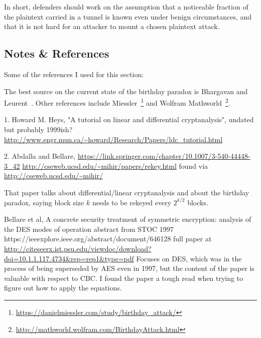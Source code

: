 In short, defenders should work on the assumption that a noticeable
fraction of the plaintext carried in a tunnel is known even under
benign circumstances, and that it is not hard for an attacker
to mount a chosen plaintext attack.

\subsection{Notes \& References}

Some of the references I used for this section:

The best source on the current state of the birthday paradox is Bhargavan and Leurent~\cite{bhargavan2016practical}.  Other references include Miessler~\footnote{\url{https://danielmiessler.com/study/birthday_attack/}} and Wolfram Mathworld~\footnote{\url{http://mathworld.wolfram.com/BirthdayAttack.html}}.

1. Howard M. Heys, "A tutorial on linear and differential
cryptanalysis", undated but probably 1999ish?
\url{http://www.engr.mun.ca/~howard/Research/Papers/ldc_tutorial.html}

2. Abdalla and Bellare,
\url{https://link.springer.com/chapter/10.1007/3-540-44448-3_42}
\url{http://cseweb.ucsd.edu/~mihir/papers/rekey.html}
found via
\url{http://cseweb.ucsd.edu/~mihir/}

That paper talks about differential/linear cryptanalysis and about the
birthday paradox, saying block size $k$ needs to be rekeyed every
$2^{k/2}$ blocks.

Bellare et al, A concrete security treatment of symmetric encryption:
analysis of the DES modes of operation
abstract from STOC 1997
https://ieeexplore.ieee.org/abstract/document/646128
full paper at
\url{http://citeseerx.ist.psu.edu/viewdoc/download?doi=10.1.1.117.4734&rep=rep1&type=pdf}
Focuses on DES, which was in the process of being superseded by AES
even in 1997, but the content of the paper is valuable with respect to
CBC.  I found the paper a tough read when trying to figure out how to
apply the equations.

